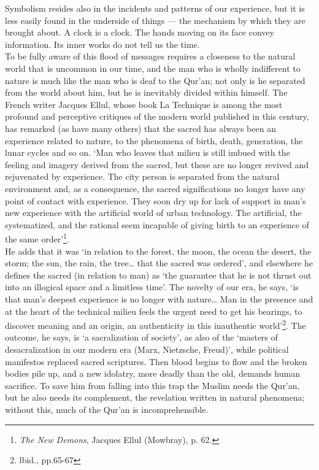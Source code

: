 \documentclass[10pt, twoside,openright]{book}
\begin{document}
Symbolism resides also in the incidents and patterns of our experience, but it is less easily found 
in the underside of things --- the mechanism by which they are brought about. A clock is a clock. The 
hands moving on its face convey information. Its inner works do not tell us the time. \\

To be fully aware of this flood of messages requires a closeness to the natural world that is 
uncommon in our time, and the man who is wholly indifferent to nature is much like the man who is 
deaf to the Qur'an; not only is he separated from the world about him, but he is inevitably divided 
within himself. The French writer Jacques Ellul, whose book La Technique is among the most profound 
and perceptive critiques of the modern world published in this century, has remarked (as have many 
others) that the sacred has always been an experience related to nature, to the phenomena of birth, 
death, generation, the lunar cycles and so on. `Man who leaves that milieu is still imbued with the 
feeling and imagery derived from the sacred, but these are no longer revived and rejuvenated by 
experience. The city person is separated from the natural environment and, as a consequence, the 
sacred significations no longer have any point of contact with experience. They soon dry up for lack 
of support in man's new experience with the artificial world of urban technology. The artificial, the 
systematized, and the rational seem incapable of giving birth to an experience of the same 
order'\footnote{\emph{The New Demons}, Jacques Ellul (Mowbray), p. 62.}.\\

He adds that it was `in relation to the forest, the moon, the ocean the desert, the storm; the sun, 
the rain, the tree\ldots{} that the sacred was ordered', and elsewhere he defines the sacred (in relation 
to man) as `the guarantee that he is not thrust out into an illogical space and a limitless time'. 
The novelty of our era, he says, `is that man's deepest experience is no longer with nature\ldots{} Man in 
the presence and at the heart of the technical milieu feels the urgent need to get his bearings, to 
discover meaning and an origin, an authenticity in this inauthentic world'\footnote{lbid., pp.65-67}. The outcome, he says, is `a sacralization of society', as also of the `masters of desacralization in our modern era (Marx, Nietzsche, Freud)', while political manifestos replaced sacred scriptures. Then blood begins to flow and the broken bodies pile up, and a new idolatry, more deadly than the old, demands human sacrifice. To save him from falling into this trap the Muslim needs the Qur'an, but he also needs its 
complement, the revelation written in natural phenomena; without this, much of the Qur'an is 
incomprehensible. \\
\end{document}
